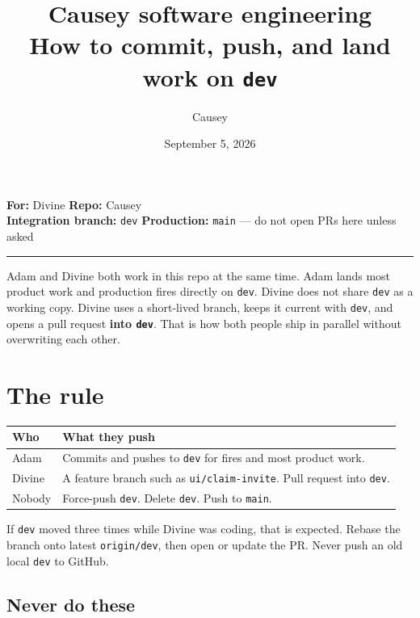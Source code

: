 \documentclass[11pt]{article}
\title{Causey software engineering\\[0.3em]
\large How to commit, push, and land work on \texttt{dev}}
\author{Causey}
\date{September 5, 2026}
\begin{document}
\maketitle
\vspace{-1.2em}

\noindent
\textbf{For:} Divine \quad
\textbf{Repo:} Causey\\
\textbf{Integration branch:} \texttt{dev} \quad
\textbf{Production:} \texttt{main} --- do not open PRs here unless asked

\vspace{0.35em}
\hrule
\vspace{0.7em}

Adam and Divine both work in this repo at the same time. Adam lands most product work and production fires directly on \texttt{dev}. Divine does not share \texttt{dev} as a working copy. Divine uses a short-lived branch, keeps it current with \texttt{dev}, and opens a pull request \textbf{into \texttt{dev}}. That is how both people ship in parallel without overwriting each other.

\section{The rule}

\begin{center}
\renewcommand{\arraystretch}{1.2}
\begin{tabular}{@{}L{1.35in}L{4.85in}@{}}
\toprule
\textbf{Who} & \textbf{What they push} \\
\midrule
Adam & Commits and pushes to \texttt{dev} for fires and most product work. \\
Divine & A feature branch such as \texttt{ui/claim-invite}. Pull request into \texttt{dev}. \\
Nobody & Force-push \texttt{dev}. Delete \texttt{dev}. Push to \texttt{main}. \\
\bottomrule
\end{tabular}
\end{center}

If \texttt{dev} moved three times while Divine was coding, that is expected. Rebase the branch onto latest \texttt{origin/dev}, then open or update the PR. Never push an old local \texttt{dev} to GitHub.

\subsection*{Never do these}
\end{document}
